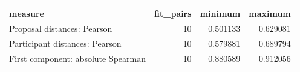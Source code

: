 \begin{tabular}{lrrr}
\toprule
measure & fit_pairs & minimum & maximum \\
\midrule
Proposal distances: Pearson & 10 & 0.501133 & 0.629081 \\
Participant distances: Pearson & 10 & 0.579881 & 0.689794 \\
First component: absolute Spearman & 10 & 0.880589 & 0.912056 \\
\bottomrule
\end{tabular}
